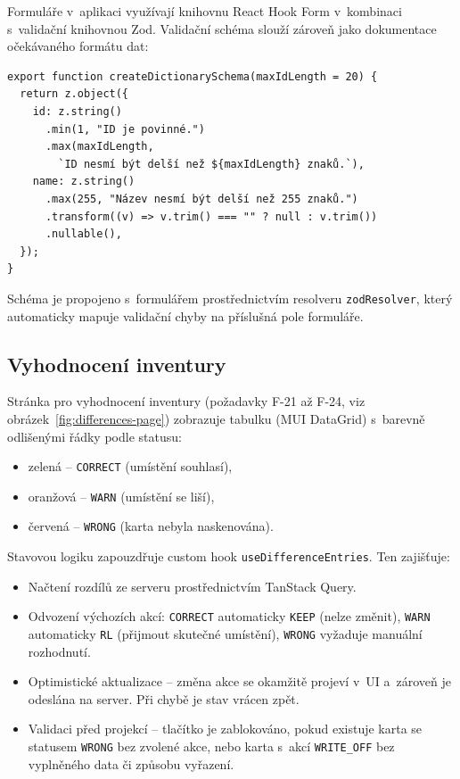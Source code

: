Formuláře v~aplikaci využívají knihovnu React Hook Form v~kombinaci s~validační knihovnou Zod. Validační schéma slouží zároveň jako dokumentace očekávaného formátu dat:

\begin{listing}[H]
\caption{Zod validační schéma pro číselníkový záznam}\label{lst:zodschema}
\begin{verbatim}
export function createDictionarySchema(maxIdLength = 20) {
  return z.object({
    id: z.string()
      .min(1, "ID je povinné.")
      .max(maxIdLength,
        `ID nesmí být delší než ${maxIdLength} znaků.`),
    name: z.string()
      .max(255, "Název nesmí být delší než 255 znaků.")
      .transform((v) => v.trim() === "" ? null : v.trim())
      .nullable(),
  });
}
\end{verbatim}
\end{listing}

Schéma je propojeno s~formulářem prostřednictvím resolveru \texttt{zodResolver}, který automaticky mapuje validační chyby na příslušná pole formuláře.

\subsection{Vyhodnocení inventury}

Stránka pro vyhodnocení inventury (požadavky F-21 až F-24, viz obrázek~\ref{fig:differences-page}) zobrazuje tabulku (MUI DataGrid) s~barevně odlišenými řádky podle statusu:
\begin{itemize}
	\item zelená -- \texttt{CORRECT} (umístění souhlasí),
	\item oranžová -- \texttt{WARN} (umístění se liší),
	\item červená -- \texttt{WRONG} (karta nebyla naskenována).
\end{itemize}

Stavovou logiku zapouzdřuje custom hook \texttt{useDifferenceEntries}. Ten zajišťuje:
\begin{itemize}
	\item Načtení rozdílů ze serveru prostřednictvím TanStack Query.
	\item Odvození výchozích akcí: \texttt{CORRECT} automaticky \texttt{KEEP} (nelze změnit), \texttt{WARN} automaticky \texttt{RL} (přijmout skutečné umístění), \texttt{WRONG} vyžaduje manuální rozhodnutí.
	\item Optimistické aktualizace -- změna akce se okamžitě projeví v~UI a~zároveň je odeslána na server. Při chybě je stav vrácen zpět.
	\item Validaci před projekcí -- tlačítko  je zablokováno, pokud existuje karta se statusem \texttt{WRONG} bez zvolené akce, nebo karta s~akcí \texttt{WRITE\_OFF} bez vyplněného data či způsobu vyřazení.
\end{itemize}

